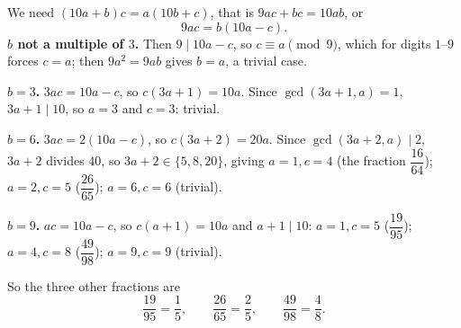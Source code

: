 We need $(10a+b)c=a(10b+c)$, that is $9ac+bc=10ab$, or
\[
9ac=b(10a-c).
\]
\textbf{$b$ not a multiple of $3$.} Then $9\mid10a-c$, so $c\equiv a\pmod9$, which for digits $1$--$9$ forces $c=a$; then $9a^2=9ab$ gives $b=a$, a trivial case.

\textbf{$b=3$.} $3ac=10a-c$, so $c(3a+1)=10a$. Since $\gcd(3a+1,a)=1$, $3a+1\mid10$, so $a=3$ and $c=3$: trivial.

\textbf{$b=6$.} $3ac=2(10a-c)$, so $c(3a+2)=20a$. Since $\gcd(3a+2,a)\mid2$, $3a+2$ divides $40$, so $3a+2\in\{5,8,20\}$, giving $a=1,c=4$ (the fraction $\dfrac{16}{64}$); $a=2,c=5$ ($\dfrac{26}{65}$); $a=6,c=6$ (trivial).

\textbf{$b=9$.} $ac=10a-c$, so $c(a+1)=10a$ and $a+1\mid10$: $a=1,c=5$ ($\dfrac{19}{95}$); $a=4,c=8$ ($\dfrac{49}{98}$); $a=9,c=9$ (trivial).

So the three other fractions are
\[
\boxed{\dfrac{19}{95}=\dfrac{1}{5},\qquad \dfrac{26}{65}=\dfrac{2}{5},\qquad \dfrac{49}{98}=\dfrac{4}{8}} .
\]
